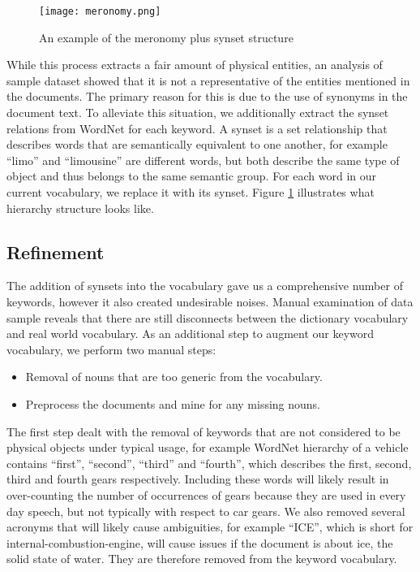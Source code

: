 	\begin{figure}
	   \centering  
	   \texttt{[image: meronomy.png]}
	   \caption{An example of the meronomy plus synset structure}
	   \label{figure:meronomy}
	\end{figure}

While this process extracts a fair amount of physical entities, an analysis of
sample dataset showed that it is not a representative of the entities mentioned
in the documents. The primary reason for this is due to the use of synonyms
in the document text. To alleviate this situation, we additionally extract
the synset relations from WordNet for each keyword. A synset is a set
relationship that describes words that are semantically equivalent to one
another, for example ``limo'' and ``limousine'' are different words, but both
describe the same type of object and thus belongs to the same semantic group.
For each word in our current vocabulary, we replace it with its synset. Figure
\ref{figure:meronomy} illustrates what hierarchy structure looks like.




\subsection{Refinement}
The addition of synsets into the vocabulary gave us a comprehensive number of
keywords, however it also created undesirable noises. Manual examination of data
sample reveals that there are still disconnects between the dictionary
vocabulary and real world vocabulary. As an additional step to augment our
keyword vocabulary, we perform two manual steps:

\begin{itemize} [noitemsep]
  \item Removal of nouns that are too generic from the vocabulary.
  \item Preprocess the documents and mine for any missing nouns.
\end{itemize}
The first step dealt with the removal of keywords that are not considered to be
physical objects under typical usage, for example WordNet hierarchy of a
vehicle contains ``first'', ``second'', ``third'' and ``fourth'', which
describes the first, second, third and fourth gears respectively. Including
these words will likely result in over-counting the number of occurrences of
gears because they are used in every day speech, but not typically with respect
to car gears. We also removed several acronyms that will likely cause
ambiguities, for example ``ICE'', which is short for internal-combustion-engine,
will cause issues if the document is about ice, the solid state of water. They
are therefore removed from the keyword vocabulary.

